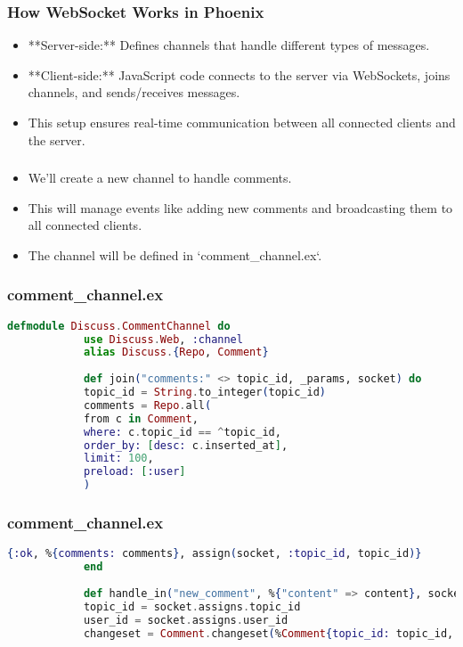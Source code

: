 \documentclass[aspectratio=169, table]{beamer}
\begin{document}
	\begin{frame}
		\frametitle{How WebSocket Works in Phoenix}
		\begin{itemize}
			\item **Server-side:** Defines channels that handle different types of messages.
			\item **Client-side:** JavaScript code connects to the server via WebSockets, joins channels, and sends/receives messages.
			\item This setup ensures real-time communication between all connected clients and the server.
		\end{itemize}
		\end{frame}
	
	\begin{frame}
	\frametitle{}
	\begin{itemize}
		\item We'll create a new channel to handle comments.
		\item This will manage events like adding new comments and broadcasting them to all connected clients.
		\item The channel will be defined in `comment\_channel.ex`.
	\end{itemize}
	\end{frame}
	
	\begin{frame}[fragile]
		\frametitle{comment\_channel.ex}
		\begin{lstlisting}[language=Elixir]
			defmodule Discuss.CommentChannel do
			use Discuss.Web, :channel
			alias Discuss.{Repo, Comment}
			
			def join("comments:" <> topic_id, _params, socket) do
			topic_id = String.to_integer(topic_id)
			comments = Repo.all(
			from c in Comment,
			where: c.topic_id == ^topic_id,
			order_by: [desc: c.inserted_at],
			limit: 100,
			preload: [:user]
			)
		\end{lstlisting}
	\end{frame}
	
	\begin{frame}[fragile]
		\frametitle{comment\_channel.ex}
		\begin{lstlisting}[language=Elixir]
			{:ok, %{comments: comments}, assign(socket, :topic_id, topic_id)}
			end
			
			def handle_in("new_comment", %{"content" => content}, socket) do
			topic_id = socket.assigns.topic_id
			user_id = socket.assigns.user_id
			changeset = Comment.changeset(%Comment{topic_id: topic_id, user_id: user_id}, %{"content" => content})
		\end{lstlisting}
	\end{frame}
	
\end{document}
